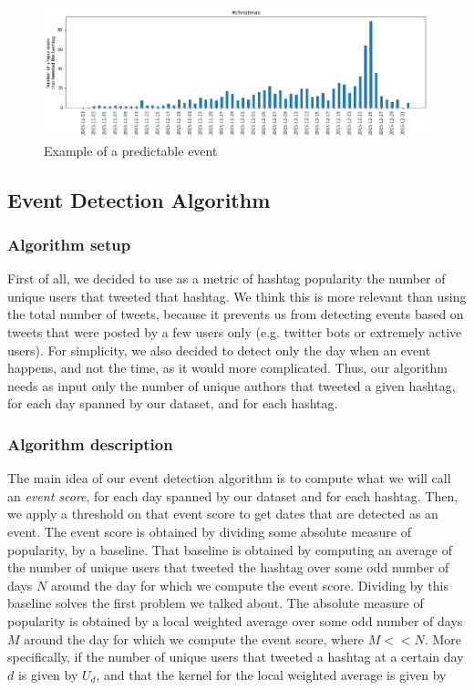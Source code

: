 \documentclass[11pt]{article}
\begin{document}
\begin{figure}[htbp]
  \vspace*{-1mm}
  \centering
  \includegraphics[width=\columnwidth]{figures/freq_event_type2.png}
  \vspace{-5mm}
  \caption{Example of a predictable event}
  \label{fig:predictable_event}
\end{figure}

\subsection{Event Detection Algorithm}
\subsubsection{Algorithm setup}
First of all, we decided to use as a metric of hashtag popularity the number of unique users that tweeted that hashtag. We think this is more relevant than using the total number of tweets, because it prevents us from detecting events based on tweets that were posted by a few users only (e.g. twitter bots or extremely active users). For simplicity, we also decided to detect only the day when an event happens, and not the time, as it would more complicated. Thus, our algorithm needs as input only the number of unique authors that tweeted a given hashtag, for each day spanned by our dataset, and for each hashtag.

\subsubsection{Algorithm description}
The main idea of our event detection algorithm is to compute what we will call an \textit{event score}, for each day spanned by our dataset and for each hashtag. Then, we apply a threshold on that event score to get dates that are detected as an event.
The event score is obtained by dividing some absolute measure of popularity, by a baseline. That baseline is obtained by computing an average of the number of unique users that tweeted the hashtag over some odd number of days $N$ around the day for which we compute the event score. Dividing by this baseline solves the first problem we talked about. The absolute measure of popularity is obtained by a local weighted average over some odd number of days $M$ around the day for which we compute the event score, where $M << N$.
More specifically, if the number of unique users that tweeted a hashtag at a certain day $d$ is given by $U_d$, and that the kernel for the local weighted average is given by 
\end{document}
